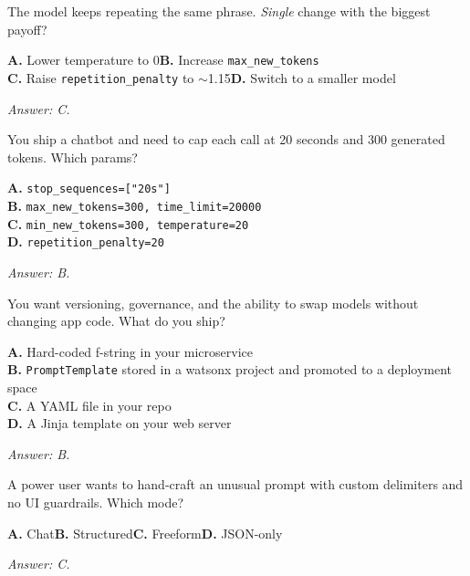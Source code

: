 \begin{practicebox}[title=\textbf{Q2.2 --- Parameter pick}]
The model keeps repeating the same phrase. \emph{Single} change with the biggest payoff?

\textbf{A.} Lower temperature to 0\hspace{1em}\textbf{B.} Increase \texttt{max\_new\_tokens}\\
\textbf{C.} Raise \texttt{repetition\_penalty} to $\sim$1.15\hspace{1em}\textbf{D.} Switch to a smaller model

\vspace{0.2cm}\textit{Answer: C.}
\end{practicebox}

\begin{practicebox}[title=\textbf{Q2.3 --- Stop criteria}]
You ship a chatbot and need to cap each call at 20 seconds and 300 generated tokens. Which params?

\textbf{A.} \texttt{stop\_sequences=["20s"]}\\
\textbf{B.} \texttt{max\_new\_tokens=300, time\_limit=20000}\\
\textbf{C.} \texttt{min\_new\_tokens=300, temperature=20}\\
\textbf{D.} \texttt{repetition\_penalty=20}

\vspace{0.2cm}\textit{Answer: B.}
\end{practicebox}

\begin{practicebox}[title=\textbf{Q2.4 --- Prompt template}]
You want versioning, governance, and the ability to swap models without changing app code. What do you ship?

\textbf{A.} Hard-coded f-string in your microservice\\
\textbf{B.} \texttt{PromptTemplate} stored in a watsonx project and promoted to a deployment space\\
\textbf{C.} A YAML file in your repo\\
\textbf{D.} A Jinja template on your web server

\vspace{0.2cm}\textit{Answer: B.}
\end{practicebox}

\begin{practicebox}[title=\textbf{Q2.5 --- Prompt Lab mode}]
A power user wants to hand-craft an unusual prompt with custom delimiters and no UI guardrails. Which mode?

\textbf{A.} Chat\hspace{1em}\textbf{B.} Structured\hspace{1em}\textbf{C.} Freeform\hspace{1em}\textbf{D.} JSON-only

\vspace{0.2cm}\textit{Answer: C.}
\end{practicebox}

